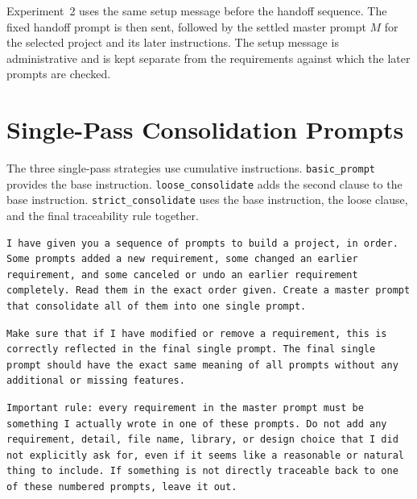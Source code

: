 Experiment~2 uses the same setup message before the handoff sequence. The
fixed handoff prompt is then sent, followed by the settled master prompt $M$
for the selected project and its later instructions. The setup message is
administrative and is kept separate from the requirements against which the
later prompts are checked.

\section{Single-Pass Consolidation Prompts}
\label{app:consolidation-prompts}

The three single-pass strategies use cumulative instructions.
\texttt{basic\_prompt} provides the base instruction.
\texttt{loose\_consolidate} adds the second clause to the base instruction.
\texttt{strict\_consolidate} uses the base instruction, the loose clause, and
the final traceability rule together.

\begin{lstlisting}[breaklines=true, basicstyle=\small\ttfamily, caption={\texttt{basic\_prompt}: base consolidation instruction.}]
I have given you a sequence of prompts to build a project, in order. Some prompts added a new requirement, some changed an earlier requirement, and some canceled or undo an earlier requirement completely. Read them in the exact order given. Create a master prompt that consolidate all of them into one single prompt.
\end{lstlisting}

\begin{lstlisting}[breaklines=true, basicstyle=\small\ttfamily, caption={Additional clause used by \texttt{loose\_consolidate}.}]
Make sure that if I have modified or remove a requirement, this is correctly reflected in the final single prompt. The final single prompt should have the exact same meaning of all prompts without any additional or missing features.
\end{lstlisting}

\begin{lstlisting}[breaklines=true, basicstyle=\small\ttfamily, caption={Additional traceability rule used by \texttt{strict\_consolidate}.}]
Important rule: every requirement in the master prompt must be something I actually wrote in one of these prompts. Do not add any requirement, detail, file name, library, or design choice that I did not explicitly ask for, even if it seems like a reasonable or natural thing to include. If something is not directly traceable back to one of these numbered prompts, leave it out.
\end{lstlisting}

